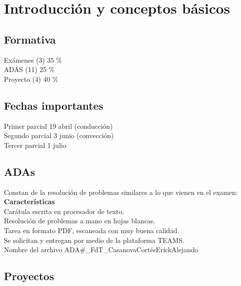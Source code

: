 \documentclass[11pt]{report}
\theoremstyle{plain}
\theoremstyle{definition}
\begin{document}

\tableofcontents

\chapter{Introducción y conceptos básicos}

\section{Formativa}
Exámenes (3) 35 \% \\
ADAS (11) 25 \% \\
Proyecto (4) 40 \% \\

\section{Fechas importantes}

Primer parcial 19 abril (conducción) \\
Segundo parcial 3 junio (convección) \\ 
Tercer parcial 1 julio \\

\section{ADAs}
Constan de la resolución de problemas similares a lo que vienen en el examen:\\

\textbf{Características}\\
Carátula escrita en procesador de texto.\\
Resolución de problemas a mano en hojas blancas.\\
Tarea en formato PDF, escaneada con muy buena calidad.\\
Se solicitan y entregan por medio de la plataforma TEAMS.\\
Nombre del archivo ADA\#\_FdT\_CasanovaCortésErickAlejando\\


\section{Proyectos}
\end{document}
